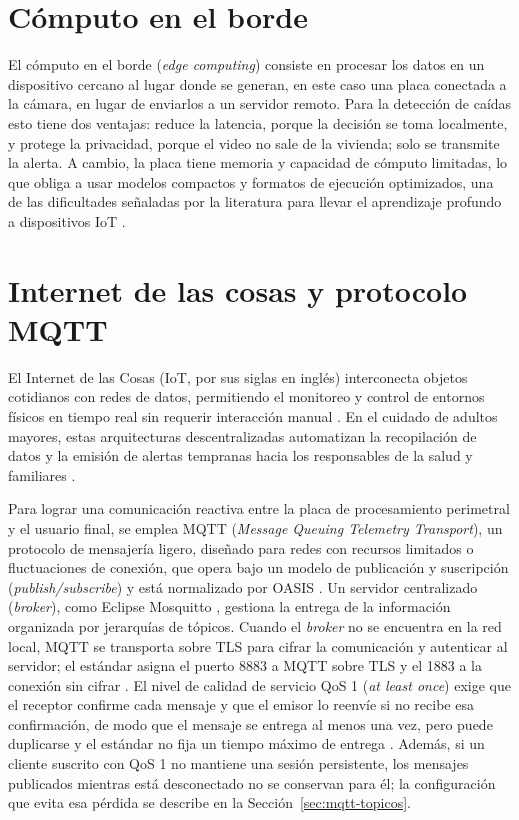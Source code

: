 \documentclass[12pt,a4paper,oneside]{book}
\theoremstyle{plain}
\theoremstyle{definition}
\theoremstyle{remark}
\begin{document}
\section{Cómputo en el borde}
\label{sec:edge}

El cómputo en el borde (\textit{edge computing}) consiste en procesar los datos en un dispositivo cercano al lugar donde se generan, en este caso una placa conectada a la cámara, en lugar de enviarlos a un servidor remoto. Para la detección de caídas esto tiene dos ventajas: reduce la latencia, porque la decisión se toma localmente, y protege la privacidad, porque el video no sale de la vivienda; solo se transmite la alerta. A cambio, la placa tiene memoria y capacidad de cómputo limitadas, lo que obliga a usar modelos compactos y formatos de ejecución optimizados, una de las dificultades señaladas por la literatura para llevar el aprendizaje profundo a dispositivos IoT \parencite{alam2022review}.

\section{Internet de las cosas y protocolo MQTT}
El Internet de las Cosas (IoT, por sus siglas en inglés) interconecta objetos cotidianos con redes de datos, permitiendo el monitoreo y control de entornos físicos en tiempo real sin requerir interacción manual \parencite{ibm2026iot}. En el cuidado de adultos mayores, estas arquitecturas descentralizadas automatizan la recopilación de datos y la emisión de alertas tempranas hacia los responsables de la salud y familiares \parencite{ibm2026iot}. 

Para lograr una comunicación reactiva entre la placa de procesamiento perimetral y el usuario final, se emplea MQTT (\textit{Message Queuing Telemetry Transport}), un protocolo de mensajería ligero, diseñado para redes con recursos limitados o fluctuaciones de conexión, que opera bajo un modelo de publicación y suscripción (\textit{publish/subscribe}) y está normalizado por OASIS \parencite{oasis2019mqtt5,mqtt2026estandar}. Un servidor centralizado (\textit{broker}), como Eclipse Mosquitto \parencite{mosquitto_2018}, gestiona la entrega de la información organizada por jerarquías de tópicos. Cuando el \textit{broker} no se encuentra en la red local, MQTT se transporta sobre TLS para cifrar la comunicación y autenticar al servidor; el estándar asigna el puerto 8883 a MQTT sobre TLS y el 1883 a la conexión sin cifrar \parencite{oasis2014mqtt311}. El nivel de calidad de servicio QoS 1 (\textit{at least once}) exige que el receptor confirme cada mensaje y que el emisor lo reenvíe si no recibe esa confirmación, de modo que el mensaje se entrega al menos una vez, pero puede duplicarse y el estándar no fija un tiempo máximo de entrega \parencite{oasis2019mqtt5}. Además, si un cliente suscrito con QoS 1 no mantiene una sesión persistente, los mensajes publicados mientras está desconectado no se conservan para él; la configuración que evita esa pérdida se describe en la Sección~\ref{sec:mqtt-topicos}.
\end{document}

